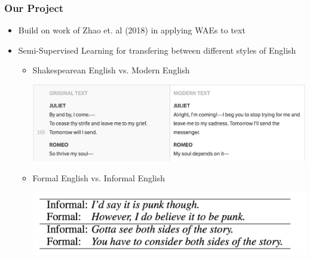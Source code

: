 \documentclass{beamer}
\begin{document}
\begin{frame}
\frametitle{Our Project}
\begin{itemize}
\setlength\itemsep{1em}
\item Build on work of Zhao et. al (2018) in applying WAEs to text

\pause 
\item Semi-Supervised Learning for transfering between different styles of English

\begin{itemize}
\pause
\item Shakespearean English vs. Modern English
\begin{center}
\includegraphics[scale=0.4]{shakespeare}
\end{center}

\pause
\item Formal English vs. Informal English
\begin{center}
\includegraphics[scale=0.4]{informal}
\end{center}
\end{itemize}
\end{itemize}
\end{frame}
\end{document}
